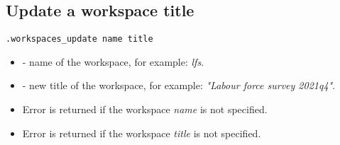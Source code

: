 \subsection{Update a workspace title}

\begin{lstlisting}[style=CommandLineStyle]
.workspaces_update name title
\end{lstlisting}

\paramsheader
\begin{itemize}
  \item {} - name of the workspace, for example: \textit{lfs}.
  \item {} - new title of the workspace, for example: \textit{"Labour force survey 2021q4"}.
\end{itemize}

\errheader
\begin{itemize}
  \item Error  is returned if the workspace \textit{name} is not specified.
  \item Error  is returned if the workspace \textit{title} is not specified.
\end{itemize}
